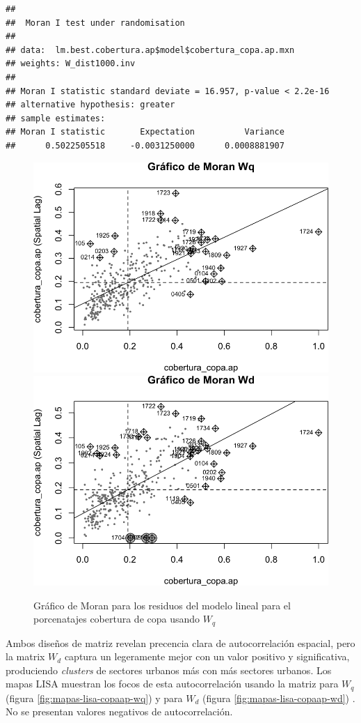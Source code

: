 \documentclass[12pt,]{book}
\begin{document}
\begin{verbatim}
## 
##  Moran I test under randomisation
## 
## data:  lm.best.cobertura.ap$model$cobertura_copa.ap.mxn  
## weights: W_dist1000.inv  
## 
## Moran I statistic standard deviate = 16.957, p-value < 2.2e-16
## alternative hypothesis: greater
## sample estimates:
## Moran I statistic       Expectation          Variance 
##      0.5022505518     -0.0031250000      0.0008881907
\end{verbatim}

\begin{figure}
\includegraphics[width=0.49\linewidth]{tesis-unigis_files/figure-latex/moranplot-copaap-w-1} \includegraphics[width=0.49\linewidth]{tesis-unigis_files/figure-latex/moranplot-copaap-w-2} \caption{Gráfico de Moran para los residuos del modelo lineal para el porcenatajes cobertura de copa usando $W_{q}$}\label{fig:moranplot-copaap-w}
\end{figure}

Ambos diseños de matriz revelan precencia clara de autocorrelación
espacial, pero la matrix \(W_d\) captura un legeramente mejor con un
valor positivo y significativa, produciendo \emph{clusters} de sectores
urbanos más con más sectores urbanos. Los mapas LISA muestran los focos
de esta autocorrelación usando la matriz para \(W_q\) (figura
\ref{fig:mapas-lisa-copaap-wq}) y para \(W_d\) (figura
\ref{fig:mapas-lisa-copaap-wd}) . No se presentan valores negativos de
autocorrelación.
\end{document}
